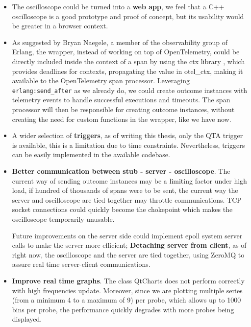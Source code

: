        \begin{itemize}
            \item The oscilloscope could be turned into a \textbf{web app}, we feel that a C++ oscilloscope is a good prototype and proof of concept, but its usability would be greater in a browser context.
            \item As suggested by Bryan Naegele, a member of the observability group of Erlang, the wrapper, instead of working on top of OpenTelemetry, could be directly included inside the context of a span by using the ctx library \cite{ctx}, which provides deadlines for contexts, propagating the value in otel\_ctx, making it available to the OpenTelemetry span processor. Leveraging \texttt{erlang:send\_after} as we already do, we could create outcome instances with telemetry events to handle successful executions and timeouts. The span processor will then be responsible for creating outcome instances, without creating the need for custom functions in the wrapper, like we have now.
            \item A wider selection of \textbf{triggers}, as of writing this thesis, only the QTA trigger is available, this is a limitation due to time constraints. Nevertheless, triggers can be easily implemented in the available codebase.
            \item \textbf{Better communication between stub - server - oscilloscope}. The current way of sending outcome instances may be a limiting factor under high load, if hundred of thousands of spans were to be sent, the current way the server and oscilloscope are tied together may throttle communications. TCP socket connections could quickly become the chokepoint which makes the oscilloscope temporarily unusable.

            Future improvements on the server side could implement epoll system server calls to make the server more efficient; \textbf{Detaching server from client}, as of right now, the oscilloscope and the server are tied together, using ZeroMQ to assure real time server-client communications.
            \item \textbf{Improve real time graphs}. The class QtCharts does not perform correctly with high frequencies update. Moreover, since we are plotting multiple series (from a minimum 4 to a maximum of 9) per probe, which allows up to 1000 bins per probe, the performance quickly degrades with more probes being displayed.
        \end{itemize}
